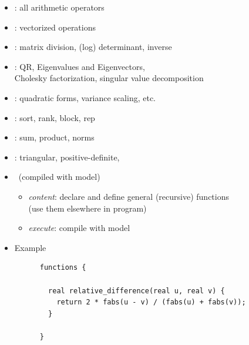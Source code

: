 \documentclass[10pt]{report}
\begin{document}

\begin{itemize}\small
\item {}: all arithmetic operators
\item {}: vectorized operations
\item {}: matrix division, (log) determinant,
  inverse 
\item {}: QR, Eigenvalues and Eigenvectors, 
  \\
  Cholesky factorization, singular value decomposition
\item {}: quadratic forms, variance scaling, etc.
\item {}: sort, rank, block, rep
\item {}: sum, product, norms
\item {}: triangular, positive-definite,
\end{itemize}


\begin{itemize}
\item {} \ (compiled with model)
  \vspace*{-4pt}
  \begin{itemize}\small
  \item {\slshape content}: declare and define general (recursive) functions
    \\
    {\small (use them elsewhere in program)}
  \item {\slshape execute}: compile with model
  \end{itemize}
  \vspace*{6pt}
\item Example
  \\[6pt]
  \begin{minipage}[t]{0.8\textwidth}
    \footnotesize
    \begin{Verbatim}
      functions {

        real relative_difference(real u, real v) {
          return 2 * fabs(u - v) / (fabs(u) + fabs(v));
        }

      }
    \end{Verbatim}
  \end{minipage}
\end{itemize}
\end{document}
